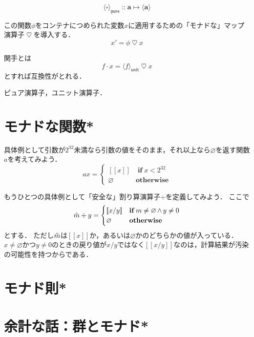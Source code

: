 \documentclass[twocolumn]{jsbook}
\def\[{[\![}
\def\]{]\!]}
\newcommand{\hsklType}[1]{\textbf{#1}}
\DeclareMathOperator{\hsklFmap}{\cdot}
\DeclareMathOperator{\hsklMonadMap}{\heartsuit}
\newcommand{\hsklNothing}{\varnothing}
\newcommand{\hsklJust}[1]{\[#1\]}
\newcommand{\hsklMaybe}[1]{\Tilde{#1}}
\newcommand{\hsklPure}[1]{\langle#1\rangle_\textsf{pure}}
\newcommand{\hsklUnit}[1]{\langle#1\rangle_\textsf{unit}}
\newcommand{\mathKeyword}[1]{\mathbf{#1}}
\DeclareMathOperator{\mathAnd}{\wedge}
\DeclareMathOperator{\mathIn}{::}
\DeclareMathOperator{\mathIf}{\mathKeyword{if}}
\DeclareMathOperator{\mathMapsTo}{\mapsto}
\newcommand{\mathOtherwise}{\mathKeyword{otherwise}}
\newcommand{\mathSomething}{\square}
\newcommand{\mathMorph}[2]{#1\mathMapsTo#2}
\begin{document}
$$\hsklPure{\mathSomething}\mathIn\mathMorph{\hsklType{a}}{\langle\hsklType{a}\rangle}$$

この関数$\phi$をコンテナにつめられた変数$x$に適用するための「モナドな」マップ演算子$\hsklMonadMap$を導入する．
$$x'=\phi\hsklMonadMap x$$

関手とは
$$f\hsklFmap x=\hsklUnit{f}\hsklMonadMap x$$
とすれば互換性がとれる．


ピュア演算子，ユニット演算子．

\section{モナドな関数*}

具体例として引数が$2^{32}$未満なら引数の値をそのまま，それ以上なら$\hsklNothing$を返す関数$a$を考えてみよう．
\begin{equation*}
ax=\begin{cases}
\hsklJust{x}&\mathIf x<2^{32}\\
\hsklNothing&\mathOtherwise
\end{cases}
\end{equation*}


もうひとつの具体例として「安全な」割り算演算子$\div$を定義してみよう．
ここで
\begin{equation*}
\hsklMaybe{m}\div y=\begin{cases}\hsklJust{x/y}&\mathIf m\neq\hsklNothing\mathAnd y\neq0\\
\hsklNothing&\mathOtherwise\end{cases}
\end{equation*}
とする．
ただし$\hsklMaybe{m}$は$\hsklJust{x}$か，あるいは$\hsklNothing$かのどちらかの値が入っている．
$x\neq\hsklNothing$かつ$y\neq0$のときの戻り値が$x/y$ではなく$\hsklJust{x/y}$なのは，計算結果が汚染の可能性を持つからである．



\section{モナド則*}

\section*{余計な話：群とモナド*}
\end{document}
